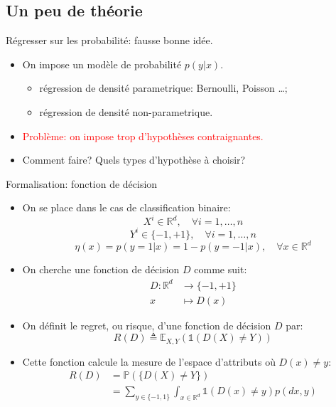 \documentclass[8pt]{beamer}
\begin{document}
	\subsection{Un peu de théorie}
		\begin{frame}{Régresser sur les probabilité: fausse bonne idée.}
			\begin{itemize}
				\item<1-> On impose un modèle de probabilité $p(y\vert x)$.
					\begin{itemize}
						\item régression de densité parametrique: Bernoulli, Poisson \dots;
						\item régression de densité non-parametrique.
					\end{itemize}
				\item<2-> \textcolor{red}{Problème: on impose trop d'hypothèses contraignantes.}
				\item<3-> Comment faire? Quels types d'hypothèse à choisir?
			\end{itemize}
		\end{frame}
		\begin{frame}{Formalisation: fonction de décision}
			\begin{itemize}
				\item<1-> On se place dans le cas de classification binaire:
					$$ X^i \in \mathbb{R}^d , \quad \forall i=1,\dots,n$$
					$$ Y^i \in \{-1, +1\} , \quad \forall i=1,\dots,n$$
					$$\eta(x) = p(y = 1 \vert x) = 1 - p(y = -1 \vert x), \quad \forall x \in \mathbb{R}^d$$
				\item<2-> On cherche une fonction de décision $D$ comme suit:
				\begin{align*}
					D: \mathbb{R}^d &\rightarrow \{-1, +1\} \\
					x &\mapsto D(x)
				\end{align*}
				\item<3-> On définit le regret, ou risque, d'une fonction de décision $D$ par:
				\begin{equation}
					R(D) \triangleq \mathbb{E}_{X,Y}(\mathbb{1}(D(X)\neq Y))
				\end{equation}
				\item<4-> Cette fonction calcule la mesure de l'espace d'attributs où $D(x) \neq y$:
				\begin{align*}
					R(D) &= \mathbb{P}(\{D(X)\neq Y\})\\
						 &= \sum_{y\in \{-1, 1\}} \int_{x \in \mathbb{R}^d} \mathbb{1}(D(x)\neq y) p(dx, y)
				\end{align*}
			\end{itemize}
		\end{frame}
\end{document}
